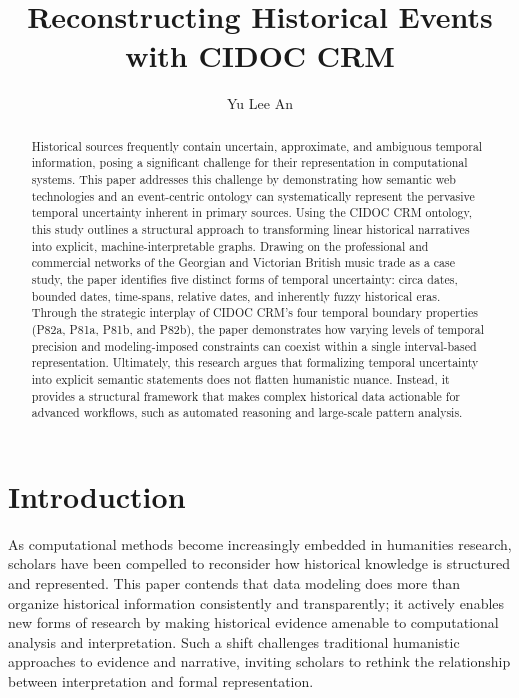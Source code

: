 \documentclass[final]{anthology-ch} %
\title{Reconstructing Historical Events with CIDOC CRM}
\author[1]{Yu Lee An}[
  orcid=0000-0001-8608-5583
]
\affiliation{1}{School of Information and Library Science, University of North Carolina at Chapel Hill}
\begin{document}
\maketitle

\begin{abstract}
Historical sources frequently contain uncertain, approximate, and ambiguous temporal information, posing a significant challenge for their representation in computational systems. This paper addresses this challenge by demonstrating how semantic web technologies and an event-centric ontology can systematically represent the pervasive temporal uncertainty inherent in primary sources. Using the CIDOC CRM ontology, this study outlines a structural approach to transforming linear historical narratives into explicit, machine-interpretable graphs. Drawing on the professional and commercial networks of the Georgian and Victorian British music trade as a case study, the paper identifies five distinct forms of temporal uncertainty: circa dates, bounded dates, time-spans, relative dates, and inherently fuzzy historical eras. Through the strategic interplay of CIDOC CRM's four temporal boundary properties (P82a, P81a, P81b, and P82b), the paper demonstrates how varying levels of temporal precision and modeling-imposed constraints can coexist within a single interval-based representation. Ultimately, this research argues that formalizing temporal uncertainty into explicit semantic statements does not flatten humanistic nuance. Instead, it provides a structural framework that makes complex historical data actionable for advanced workflows, such as automated reasoning and large-scale pattern analysis.
\end{abstract}

\section{Introduction} \label{sec:intro}

As computational methods become increasingly embedded in humanities research, scholars have been compelled to reconsider how historical knowledge is structured and represented. This paper contends that data modeling does more than organize historical information consistently and transparently; it actively enables new forms of research by making historical evidence amenable to computational analysis and interpretation. Such a shift challenges traditional humanistic approaches to evidence and narrative, inviting scholars to rethink the relationship between interpretation and formal representation.
\end{document}
